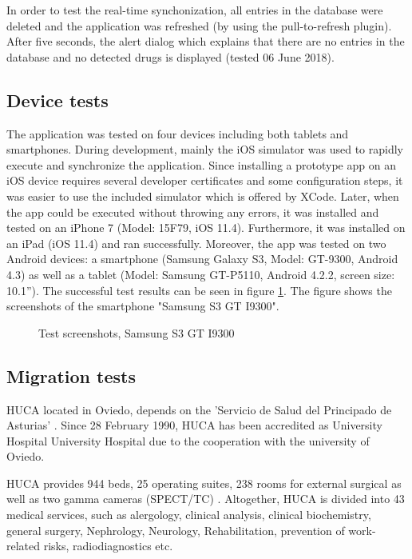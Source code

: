 In order to test the real-time synchonization, all entries in the database were deleted and the application was refreshed (by using the pull-to-refresh plugin). After five seconds, the alert dialog which explains that there are no entries in the database and no detected drugs is displayed (tested 06 June 2018). 

\subsection{Device tests}

The application was tested on four devices including both tablets and smartphones. During development, mainly the iOS simulator was used to rapidly execute and synchronize the application. Since installing a prototype app on an iOS device requires several developer certificates and some configuration steps, it was easier to use the included simulator which is offered by XCode. 
Later, when the app could be executed without throwing any errors, it was installed and tested on an iPhone 7 (Model: 15F79, iOS 11.4). Furthermore, it was installed on an iPad (iOS 11.4) and ran successfully. 
Moreover, the app was tested on two Android devices: a smartphone (Samsung Galaxy S3, Model: GT-9300, Android 4.3) as well as a tablet (Model: Samsung GT-P5110, Android 4.2.2, screen size: 10.1'').
The successful test results can be seen in figure \ref{fig:s3_screenshots}. The figure shows the screenshots of the smartphone "Samsung S3 GT I9300".

\begin{figure}
\centering
\subfigure{\texttt{[image: s3\_01]}}
\subfigure{\texttt{[image: s3\_02]}}
\subfigure{\texttt{[image: s3\_03]}}
\subfigure{\texttt{[image: s3\_04]}}
\caption{\label{fig:s3_screenshots} Test screenshots, Samsung S3 GT I9300}
\end{figure}

\subsection{Migration tests}\label{tests}

\ac{HUCA} located in Oviedo, depends on the 'Servicio de Salud del Principado de Asturias' \cite{huca}. Since 28 February 1990, HUCA has been accredited as University Hospital University Hospital due to the cooperation with the university of Oviedo.

HUCA provides 944 beds, 25 operating suites, 238 rooms for external surgical as well as two gamma cameras (\ac{SPECT}/\ac{TC}) \cite{huca}. Altogether, HUCA is divided into 43 medical services, such as alergology, clinical analysis, clinical biochemistry, general surgery, Nephrology, Neurology, Rehabilitation, prevention of work-related risks, radiodiagnostics etc. 

